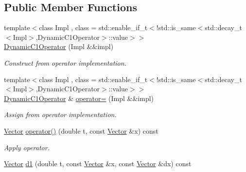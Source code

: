 \subsection*{Public Member Functions}
\begin{DoxyCompactItemize}
\item 
\hypertarget{classSpacy_1_1DynamicC1Operator_af2abd3f08198356cbacd4dc981052a6e}{}{\footnotesize template$<$class Impl , class  = std\+::enable\+\_\+if\+\_\+t$<$!std\+::is\+\_\+same$<$std\+::decay\+\_\+t$<$\+Impl$>$,\+Dynamic\+C1\+Operator$>$\+::value$>$$>$ }\\\hyperlink{classSpacy_1_1DynamicC1Operator_af2abd3f08198356cbacd4dc981052a6e}{Dynamic\+C1\+Operator} (Impl \&\&impl)\label{classSpacy_1_1DynamicC1Operator_af2abd3f08198356cbacd4dc981052a6e}

\begin{DoxyCompactList}\small\item\em Construct from operator implementation. \end{DoxyCompactList}\item 
\hypertarget{classSpacy_1_1DynamicC1Operator_a726a57f019b9146faba5124c697a4b75}{}{\footnotesize template$<$class Impl , class  = std\+::enable\+\_\+if\+\_\+t$<$!std\+::is\+\_\+same$<$std\+::decay\+\_\+t$<$\+Impl$>$,\+Dynamic\+C1\+Operator$>$\+::value$>$$>$ }\\\hyperlink{classSpacy_1_1DynamicC1Operator}{Dynamic\+C1\+Operator} \& \hyperlink{classSpacy_1_1DynamicC1Operator_a726a57f019b9146faba5124c697a4b75}{operator=} (Impl \&\&impl)\label{classSpacy_1_1DynamicC1Operator_a726a57f019b9146faba5124c697a4b75}

\begin{DoxyCompactList}\small\item\em Assign from operator implementation. \end{DoxyCompactList}\item 
\hypertarget{classSpacy_1_1DynamicC1Operator_a0859e4c204d9599769c42ca4147f1875}{}\hyperlink{classSpacy_1_1Vector}{Vector} \hyperlink{classSpacy_1_1DynamicC1Operator_a0859e4c204d9599769c42ca4147f1875}{operator()} (double t, const \hyperlink{classSpacy_1_1Vector}{Vector} \&x) const \label{classSpacy_1_1DynamicC1Operator_a0859e4c204d9599769c42ca4147f1875}

\begin{DoxyCompactList}\small\item\em Apply operator. \end{DoxyCompactList}\item 
\hypertarget{classSpacy_1_1DynamicC1Operator_acac514b4a574321a0bf923f9b348e106}{}\hyperlink{classSpacy_1_1Vector}{Vector} \hyperlink{classSpacy_1_1DynamicC1Operator_acac514b4a574321a0bf923f9b348e106}{d1} (double t, const \hyperlink{classSpacy_1_1Vector}{Vector} \&x, const \hyperlink{classSpacy_1_1Vector}{Vector} \&dx) const \label{classSpacy_1_1DynamicC1Operator_acac514b4a574321a0bf923f9b348e106}


\end{DoxyCompactItemize}
